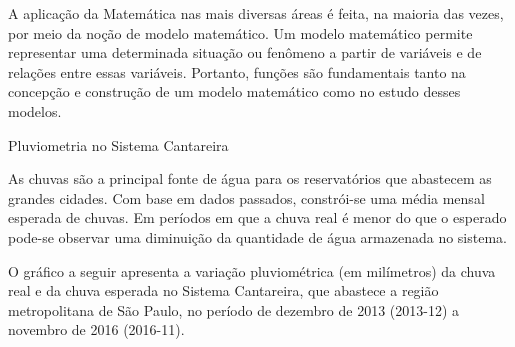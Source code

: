 A aplicação da Matemática nas mais diversas áreas é feita, na maioria das vezes, por meio da noção de modelo matemático. Um modelo matemático permite representar uma determinada situação ou fenômeno a partir de variáveis e de relações entre essas variáveis. Portanto, funções são fundamentais tanto na concepção e construção de um modelo matemático como no estudo desses modelos.


\begin{task}{ Pluviometria no Sistema Cantareira}
\label{\detokenize{AF106-0:atividade-pluviometria-no-sistema-cantareira}}\label{\detokenize{AF106-0:ativ-funcoes-pluviometria}}

As chuvas são a principal fonte de água para os reservatórios que abastecem as grandes cidades. Com base em dados passados, constrói-se uma média mensal esperada de chuvas. Em períodos em que a chuva real é menor do que o esperado pode-se observar uma diminuição da quantidade de água armazenada no sistema.

O gráfico a seguir apresenta a variação pluviométrica (em milímetros) da chuva real e da chuva esperada no Sistema Cantareira, que abastece a região metropolitana de São Paulo, no período de dezembro de 2013 (2013-12) a novembro de 2016 (2016-11).

\begin{figure}[H]
\centering


\end{figure}
\end{task}
